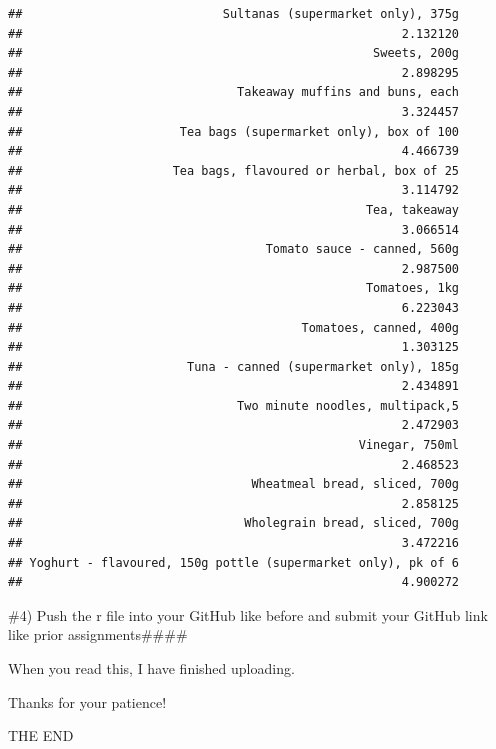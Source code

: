 \documentclass[
  landscape]{article}
\begin{document}
\begin{verbatim}
##                            Sultanas (supermarket only), 375g 
##                                                     2.132120 
##                                                 Sweets, 200g 
##                                                     2.898295 
##                              Takeaway muffins and buns, each 
##                                                     3.324457 
##                      Tea bags (supermarket only), box of 100 
##                                                     4.466739 
##                     Tea bags, flavoured or herbal, box of 25 
##                                                     3.114792 
##                                                Tea, takeaway 
##                                                     3.066514 
##                                  Tomato sauce - canned, 560g 
##                                                     2.987500 
##                                                Tomatoes, 1kg 
##                                                     6.223043 
##                                       Tomatoes, canned, 400g 
##                                                     1.303125 
##                       Tuna - canned (supermarket only), 185g 
##                                                     2.434891 
##                              Two minute noodles, multipack,5 
##                                                     2.472903 
##                                               Vinegar, 750ml 
##                                                     2.468523 
##                                Wheatmeal bread, sliced, 700g 
##                                                     2.858125 
##                               Wholegrain bread, sliced, 700g 
##                                                     3.472216 
## Yoghurt - flavoured, 150g pottle (supermarket only), pk of 6 
##                                                     4.900272
\end{verbatim}

\#4) Push the r file into your GitHub like before and submit your GitHub
link like prior assignments\#\#\#\#

When you read this, I have finished uploading.

Thanks for your patience!

THE END
\end{document}
